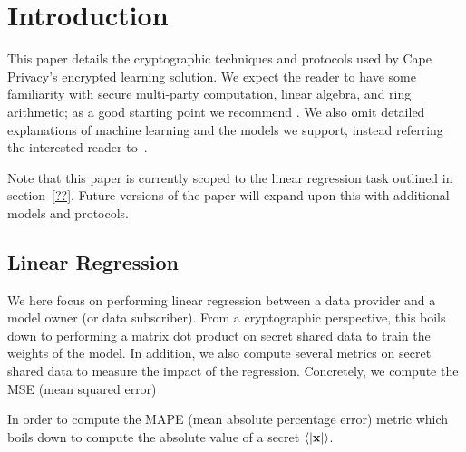 
\section{Introduction}

This paper details the cryptographic techniques and protocols used by Cape Privacy's encrypted learning solution. We expect the reader to have some familiarity with secure multi-party computation, linear algebra, and ring arithmetic; as a good starting point we recommend \cite{evans2017pragmatic}. We also omit detailed explanations of machine learning and the models we support, instead referring the interested reader to~\cite{??}.

Note that this paper is currently scoped to the linear regression task outlined in section~\ref{??}. Future versions of the paper will expand upon this with additional models and protocols.


\subsection{Linear Regression}

We here focus on performing linear regression between a data provider and a model owner (or data subscriber). From a cryptographic perspective, this boils down to performing a matrix dot product on secret shared data to train the weights of the model. In addition, we also compute several metrics on secret shared data to measure the impact of the regression. Concretely, we compute the MSE (mean squared error)

In order to compute the MAPE (mean absolute percentage error) metric which boils down to compute
the absolute value of a secret $\langle {|\mathbf{x}|} \rangle$.






